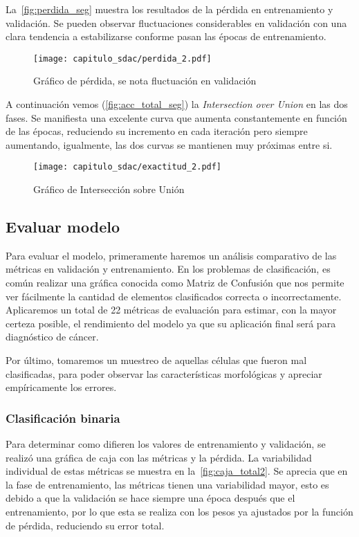 La~\autoref{fig:perdida_seg} muestra los resultados de la pérdida en
entrenamiento y validación. Se pueden observar fluctuaciones considerables en
validación con una clara tendencia a estabilizarse conforme pasan las épocas de
entrenamiento.

\begin{figure}[H]
    \centering
    \texttt{[image: capitulo\_sdac/perdida\_2.pdf]}
    \caption{Gráfico de pérdida, se nota fluctuación en validación}\label{fig:perdida_seg}

\end{figure}

A continuación vemos (\autoref{fig:acc_total_seg}) la \emph{Intersection over
Union} en las dos fases. Se manifiesta una excelente curva que aumenta
constantemente en función de las épocas, reduciendo su incremento en cada
iteración pero siempre aumentando, igualmente, las dos curvas se mantienen muy
próximas entre si.

\begin{figure}[H]
    \centering
    \texttt{[image: capitulo\_sdac/exactitud\_2.pdf]}
    \caption{Gráfico de Intersección sobre Unión}\label{fig:acc_total_seg}

\end{figure}

\subsection{Evaluar modelo}

Para evaluar el modelo, primeramente haremos un análisis comparativo de las
métricas en validación y entrenamiento. En los problemas de clasificación, es
común realizar una gráfica conocida como Matriz de Confusión que nos permite ver
fácilmente la cantidad de elementos clasificados correcta o incorrectamente.
Aplicaremos un total de 22 métricas de evaluación para estimar, con la mayor
certeza posible, el rendimiento del modelo ya que su aplicación final será para
diagnóstico de cáncer.

Por último, tomaremos un muestreo de aquellas células que fueron mal
clasificadas, para poder observar las características morfológicas y apreciar
empíricamente los errores.

\subsubsection{Clasificación binaria}

Para determinar como difieren los valores de entrenamiento y validación, se
realizó una gráfica de caja con las métricas y la pérdida. La variabilidad
individual de estas métricas se muestra en la~\autoref{fig:caja_total2}. Se
aprecia que en la fase de entrenamiento, las métricas tienen una variabilidad
mayor, esto es debido a que la validación se hace siempre una época después que
el entrenamiento, por lo que esta se realiza con los pesos ya ajustados por la
función de pérdida, reduciendo su error total.

